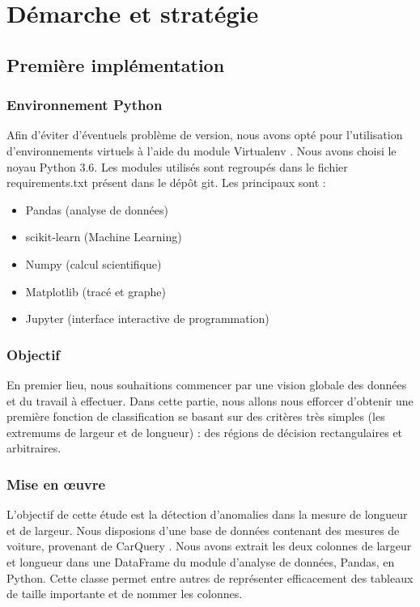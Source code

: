 \documentclass[a4paper]{report}
\begin{document}
\chapter{Démarche et stratégie}

\section{Première implémentation}

\subsection{Environnement Python}

Afin d'éviter d'éventuels problème de version, nous avons opté pour l'utilisation d'environnements virtuels à l'aide du module Virtualenv \cite{venv}. Nous avons choisi le noyau Python 3.6. Les modules utilisés sont regroupés dans le fichier requirements.txt présent dans le dépôt git. Les principaux sont :
\begin{itemize}
\item Pandas (analyse de données) \cite{pandas}
\item scikit-learn (Machine Learning) \cite{sklearn}
\item Numpy (calcul scientifique) \cite{numpy}
\item Matplotlib (tracé et graphe) \cite{matplotlib}
\item Jupyter (interface interactive de programmation) \cite{jupyter}
\end{itemize}

\subsection{Objectif}

En premier lieu, nous souhaitions commencer par une vision globale des données et du travail à effectuer. Dans cette partie, nous allons nous efforcer d'obtenir une première fonction de classification se basant sur des critères très simples (les extremums de largeur et de longueur) : des régions de décision rectangulaires et arbitraires.

\subsection{Mise en {\oe}uvre}

L'objectif de cette étude est la détection d'anomalies dans la mesure de longueur et de largeur. Nous disposions d'une base de données contenant des mesures de voiture, provenant de CarQuery \cite{carquery}. Nous avons extrait les deux colonnes de largeur et longueur dans une DataFrame du module d'analyse de données, Pandas, en Python. Cette classe permet entre autres de représenter efficacement des tableaux de taille importante et de nommer les colonnes.
\end{document}
